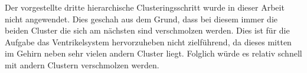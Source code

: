 Der vorgestellte dritte hierarchische Clusteringsschritt wurde in dieser Arbeit nicht angewendet. Dies geschah aus dem Grund, dass bei diesem immer die beiden Cluster die sich am nächsten sind verschmolzen werden. Dies ist für die Aufgabe das Ventrikelsystem hervorzuheben nicht zielführend, da dieses mitten im Gehirn neben sehr vielen andern Cluster liegt. Folglich würde es relativ schnell mit andern Clustern verschmolzen werden.

